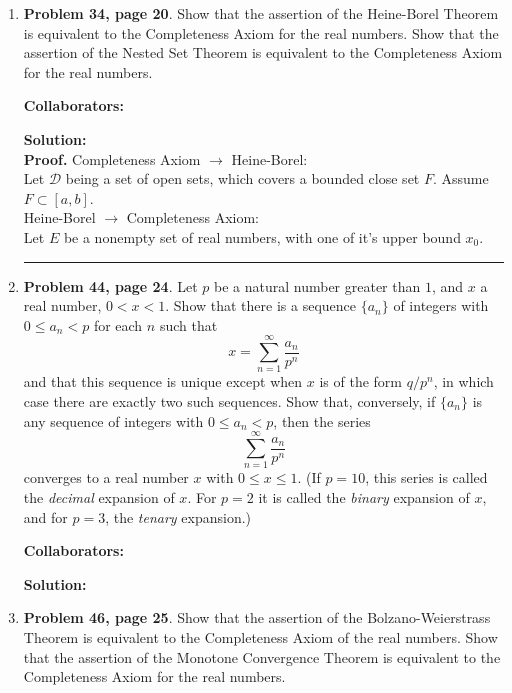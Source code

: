 \documentclass{article}%
\newenvironment{proof}[1][Proof]{\textbf{#1.} }{\ \rule{0.5em}{0.5em}}
\begin{document}
\begin{enumerate}
\item \textbf{Problem 34, page 20}.  Show that the assertion of the Heine-Borel Theorem is equivalent to the Completeness Axiom for the real numbers.  Show that the assertion of the Nested Set Theorem is equivalent to the Completeness Axiom for the real numbers.

\bigskip
\textbf{Collaborators:}\\
\smallskip
 
\textbf{Solution:} \\
\begin{proof}
Completeness Axiom $\to$ Heine-Borel: \\
Let $\mathcal{D}$ being a set of open sets, which covers a bounded close set $F$. Assume $F\subset [a, b]$.
\\
Heine-Borel $\to$ Completeness Axiom: \\
Let $E$ be a nonempty set of real numbers, with one of it's upper bound $x_0$.
\end{proof}

\bigskip

\item \textbf{Problem 44, page 24}.  Let $p$ be a natural number greater than $1$, and $x$ a real number, $0<x<1$.  Show that there is a sequence $\{a_n\}$ of integers with $0\leq a_n < p$ for each $n$ such that \[
x = \sum_{n=1}^{\infty} \frac{a_n}{p^n} \]and that this sequence is unique except when $x$ is of the form $q/p^n$, in which case there are exactly two such sequences.  Show that, conversely, if $\{a_n\}$ is any sequence of integers with $0\leq a_n < p$, then the series \[\sum_{n=1}^{\infty} \frac{a_n}{p^n} \]converges to a real number $x$ with $0\leq x \leq 1$. (If $p = 10$, this series is called the \emph{decimal} expansion of $x$.  For $p = 2$ it is called the \emph{binary} expansion of $x$, and for $p = 3$, the \emph{tenary} expansion.) 


\bigskip
\textbf{Collaborators:}\\
\smallskip
 
\textbf{Solution:}
\bigskip



\item \textbf{Problem 46, page 25}. Show that the assertion of the Bolzano-Weierstrass Theorem is equivalent to the Completeness Axiom of the real numbers.  Show that the assertion of the Monotone Convergence Theorem is equivalent to the Completeness Axiom for the real numbers.



\end{enumerate}
\end{document}
